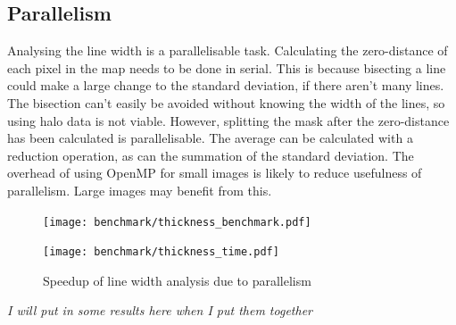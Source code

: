 \documentclass[../main.tex]{subfiles}
\begin{document}
  \subsection{Parallelism}
    Analysing the line width is a parallelisable task.
    Calculating the zero-distance of each pixel in the map needs to be done in serial.
    This is because bisecting a line could make a large change to the standard deviation, if there aren't many lines.
    The bisection can't easily be avoided without knowing the width of the lines, so using halo data is not viable.
    However, splitting the mask after the zero-distance has been calculated is parallelisable.
    The average can be calculated with a reduction operation, as can the summation of the standard deviation.
    The overhead of using OpenMP for small images is likely to reduce usefulness of parallelism.
    Large images may benefit from this.

    \begin{figure}[h]
      \centering
      \texttt{[image: benchmark/thickness\_benchmark.pdf]}

      \texttt{[image: benchmark/thickness\_time.pdf]}
      \caption{Speedup of line width analysis due to parallelism}
      \label{thicknessbenchmark}
    \end{figure}
    \textit{I will put in some results here when I put them together}
\end{document}
